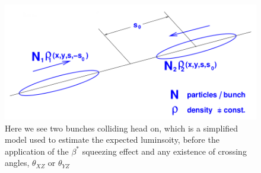 \begin{figure}
\begin{center}
\includegraphics[width=\linewidth,height=\textheight,keepaspectratio]{../HourglassCorrection/figs/simple_bunch_head_on}
\caption{ 
Here we see two bunches colliding head on, which is a simplified model used to
estimate the expected luminsoity, before the application of the $\beta^{*}$
squeezing effect and any existence of crossing angles, $\theta_{XZ}$ or
$\theta_{YZ}$ 
}
\label{fig:simple_bunch_head_on}
\end{center}
\end{figure}
